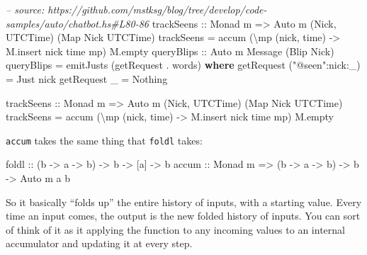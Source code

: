 \documentclass[]{article}
\newenvironment{Shaded}{}{}
\newcommand{\KeywordTok}[1]{\textcolor[rgb]{0.00,0.44,0.13}{\textbf{{#1}}}}
\newcommand{\DataTypeTok}[1]{\textcolor[rgb]{0.56,0.13,0.00}{{#1}}}
\newcommand{\StringTok}[1]{\textcolor[rgb]{0.25,0.44,0.63}{{#1}}}
\newcommand{\CommentTok}[1]{\textcolor[rgb]{0.38,0.63,0.69}{\textit{{#1}}}}
\newcommand{\OtherTok}[1]{\textcolor[rgb]{0.00,0.44,0.13}{{#1}}}
\newcommand{\FunctionTok}[1]{\textcolor[rgb]{0.02,0.16,0.49}{{#1}}}
\newcommand{\NormalTok}[1]{{#1}}
\begin{document}
\begin{Shaded}
\begin{Highlighting}[]
\CommentTok{-- source: https://github.com/mstksg/blog/tree/develop/code-samples/auto/chatbot.hs#L80-86}
\OtherTok{    trackSeens ::} \DataTypeTok{Monad} \NormalTok{m }\OtherTok{=>} \DataTypeTok{Auto} \NormalTok{m (}\DataTypeTok{Nick}\NormalTok{, }\DataTypeTok{UTCTime}\NormalTok{) (}\DataTypeTok{Map} \DataTypeTok{Nick} \DataTypeTok{UTCTime}\NormalTok{)}
    \NormalTok{trackSeens }\FunctionTok{=} \NormalTok{accum (\textbackslash{}mp (nick, time) }\OtherTok{->} \NormalTok{M.insert nick time mp) M.empty}
\OtherTok{    queryBlips ::} \DataTypeTok{Auto} \NormalTok{m }\DataTypeTok{Message} \NormalTok{(}\DataTypeTok{Blip} \DataTypeTok{Nick}\NormalTok{)}
    \NormalTok{queryBlips }\FunctionTok{=} \NormalTok{emitJusts (getRequest }\FunctionTok{.} \NormalTok{words)}
      \KeywordTok{where}
        \NormalTok{getRequest (}\StringTok{"@seen"}\FunctionTok{:}\NormalTok{nick}\FunctionTok{:}\NormalTok{_) }\FunctionTok{=} \DataTypeTok{Just} \NormalTok{nick}
        \NormalTok{getRequest _                }\FunctionTok{=} \DataTypeTok{Nothing}



\OtherTok{trackSeens ::} \DataTypeTok{Monad} \NormalTok{m }\OtherTok{=>} \DataTypeTok{Auto} \NormalTok{m (}\DataTypeTok{Nick}\NormalTok{, }\DataTypeTok{UTCTime}\NormalTok{) (}\DataTypeTok{Map} \DataTypeTok{Nick} \DataTypeTok{UTCTime}\NormalTok{)}
\NormalTok{trackSeens }\FunctionTok{=} \NormalTok{accum (\textbackslash{}mp (nick, time) }\OtherTok{->} \NormalTok{M.insert nick time mp) M.empty}
\end{Highlighting}
\end{Shaded}

\texttt{accum} takes the same thing that \texttt{foldl} takes:

\begin{Shaded}
\begin{Highlighting}[]
\NormalTok{foldl}\OtherTok{ ::}            \NormalTok{(b }\OtherTok{->} \NormalTok{a }\OtherTok{->} \NormalTok{b) }\OtherTok{->} \NormalTok{b }\OtherTok{->} \NormalTok{[a] }\OtherTok{->} \NormalTok{b}
\OtherTok{accum ::} \DataTypeTok{Monad} \NormalTok{m }\OtherTok{=>} \NormalTok{(b }\OtherTok{->} \NormalTok{a }\OtherTok{->} \NormalTok{b) }\OtherTok{->} \NormalTok{b }\OtherTok{->} \DataTypeTok{Auto} \NormalTok{m a b}
\end{Highlighting}
\end{Shaded}

So it basically ``folds up'' the entire history of inputs, with a starting value. Every time an
input comes, the output is the new folded history of inputs. You can sort of think of it as it
applying the function to any incoming values to an internal accumulator and updating it at every
step.
\end{document}
